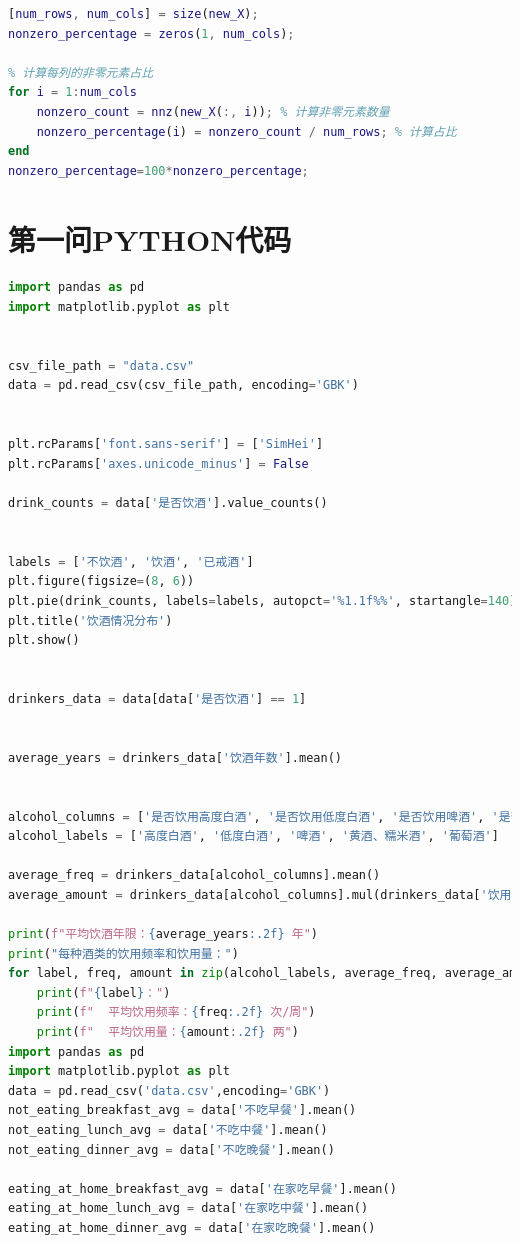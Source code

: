 \documentclass{cumcmthesis}
\begin{document}
\begin{appendices}
\begin{lstlisting}[language=matlab]
% 各食物食用人数占比,结果储存在nonzero_percentage
[num_rows, num_cols] = size(new_X);
nonzero_percentage = zeros(1, num_cols);

% 计算每列的非零元素占比
for i = 1:num_cols
    nonzero_count = nnz(new_X(:, i)); % 计算非零元素数量
    nonzero_percentage(i) = nonzero_count / num_rows; % 计算占比
end
nonzero_percentage=100*nonzero_percentage;
\end{lstlisting}
\section{第一问PYTHON代码}
\begin{lstlisting}[language=python]import pandas as pd
import matplotlib.pyplot as plt


csv_file_path = "data.csv"  
data = pd.read_csv(csv_file_path, encoding='GBK')


plt.rcParams['font.sans-serif'] = ['SimHei']
plt.rcParams['axes.unicode_minus'] = False 

drink_counts = data['是否饮酒'].value_counts()


labels = ['不饮酒', '饮酒', '已戒酒']
plt.figure(figsize=(8, 6))
plt.pie(drink_counts, labels=labels, autopct='%1.1f%%', startangle=140)
plt.title('饮酒情况分布')
plt.show()


drinkers_data = data[data['是否饮酒'] == 1]


average_years = drinkers_data['饮酒年数'].mean()


alcohol_columns = ['是否饮用高度白酒', '是否饮用低度白酒', '是否饮用啤酒', '是否饮用黄酒、糯米酒', '是否饮用葡萄酒']
alcohol_labels = ['高度白酒', '低度白酒', '啤酒', '黄酒、糯米酒', '葡萄酒']

average_freq = drinkers_data[alcohol_columns].mean()
average_amount = drinkers_data[alcohol_columns].mul(drinkers_data['饮用频率'], axis=0).sum() / drinkers_data['饮用频率'].sum()

print(f"平均饮酒年限：{average_years:.2f} 年")
print("每种酒类的饮用频率和饮用量：")
for label, freq, amount in zip(alcohol_labels, average_freq, average_amount):
    print(f"{label}：")
    print(f"  平均饮用频率：{freq:.2f} 次/周")
    print(f"  平均饮用量：{amount:.2f} 两")
import pandas as pd
import matplotlib.pyplot as plt
data = pd.read_csv('data.csv',encoding='GBK')
not_eating_breakfast_avg = data['不吃早餐'].mean()
not_eating_lunch_avg = data['不吃中餐'].mean()
not_eating_dinner_avg = data['不吃晚餐'].mean()

eating_at_home_breakfast_avg = data['在家吃早餐'].mean()
eating_at_home_lunch_avg = data['在家吃中餐'].mean()
eating_at_home_dinner_avg = data['在家吃晚餐'].mean()


\end{lstlisting}
\end{appendices}
\end{document}
